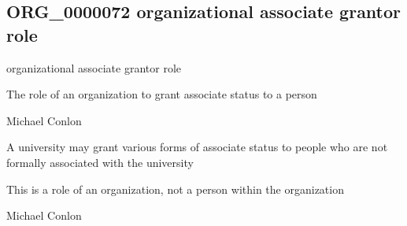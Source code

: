 \documentclass[letterpaper,10pt,english]{sphinxmanual}
\begin{document}
\subsection{ORG\_0000072 \sphinxhyphen{} organizational associate grantor role}
\label{\detokenize{doc-ORG_0000072:org-0000072-organizational-associate-grantor-role}}\label{\detokenize{doc-ORG_0000072:index-0}}\label{\detokenize{doc-ORG_0000072::doc}}
\begin{sphinxShadowBox}

\sphinxAtStartPar
organizational associate grantor role
\end{sphinxShadowBox}

\begin{sphinxShadowBox}

\sphinxAtStartPar
{\hyperref[\detokenize{doc-BFO_0000023::doc}]{}}
\end{sphinxShadowBox}

\begin{sphinxShadowBox}

\sphinxAtStartPar
The role of an organization to grant associate status to a person
\end{sphinxShadowBox}

\begin{sphinxShadowBox}

\sphinxAtStartPar
Michael Conlon 
\end{sphinxShadowBox}

\begin{sphinxShadowBox}

\sphinxAtStartPar
A university may grant various forms of associate status to people who are not formally associated with the university
\end{sphinxShadowBox}

\begin{sphinxShadowBox}

\sphinxAtStartPar
This is a role of an organization, not a person within the organization
\end{sphinxShadowBox}

\begin{sphinxShadowBox}

\sphinxAtStartPar
Michael Conlon 
\end{sphinxShadowBox}
\begin{quote}

\ignorespaces \end{quote}
\end{document}
